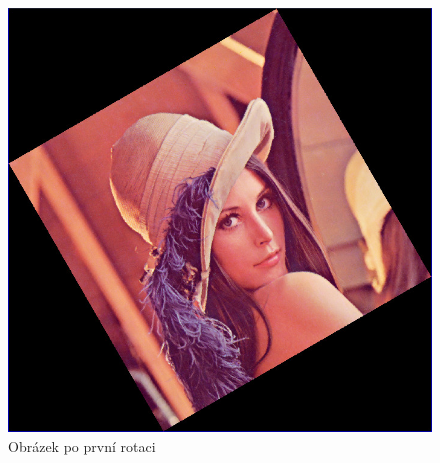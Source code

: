\begin{figure}[h!]
    \begin{center}
        \includegraphics[scale=0.4]{images/rotation_30deg.jpg}
        \caption{Obrázek po první rotaci}
    \end{center}
\end{figure}

